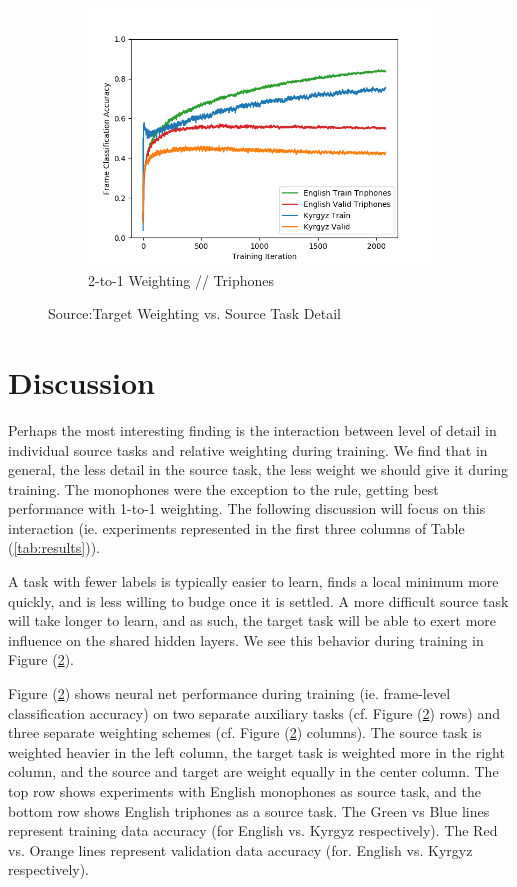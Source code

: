 \documentclass[a4paper]{article}
\begin{document}
\begin{figure}[!htbp]
\begin{subfigure}{.33\textwidth}
  \includegraphics[width=1\textwidth,keepaspectratio]{figs-1/1-to-2-tri.png}
  \caption{2-to-1 Weighting // Triphones}
  \label{fig:sub2}
\end{subfigure}
\caption{Source:Target Weighting vs. Source Task Detail}
\label{fig:1-to-2}
\end{figure}



\section{Discussion}

Perhaps the most interesting finding is the interaction between level of detail in individual source tasks and relative weighting during training. We find that in general, the less detail in the source task, the less weight we should give it during training. The monophones were the exception to the rule, getting best performance with 1-to-1 weighting. The following discussion will focus on this interaction (ie. experiments represented in the first three columns of Table (\ref{tab:results})). 

A task with fewer labels is typically easier to learn, finds a local minimum more quickly, and is less willing to budge once it is settled. A more difficult source task will take longer to learn, and as such, the target task will be able to exert more influence on the shared hidden layers. We see this behavior during training in Figure (\ref{fig:1-to-2}).

Figure (\ref{fig:1-to-2}) shows neural net performance during training (ie. frame-level classification accuracy) on two separate auxiliary tasks (cf. Figure (\ref{fig:1-to-2}) rows) and three separate weighting schemes (cf. Figure (\ref{fig:1-to-2}) columns). The source task is weighted heavier in the left column, the target task is weighted more in the right column, and the source and target are weight equally in the center column. The top row shows experiments with English monophones as source task, and the bottom row shows English triphones as a source task. The Green vs Blue lines represent training data accuracy (for English vs. Kyrgyz respectively). The Red vs. Orange lines represent validation data accuracy (for. English vs. Kyrgyz respectively).
\end{document}
